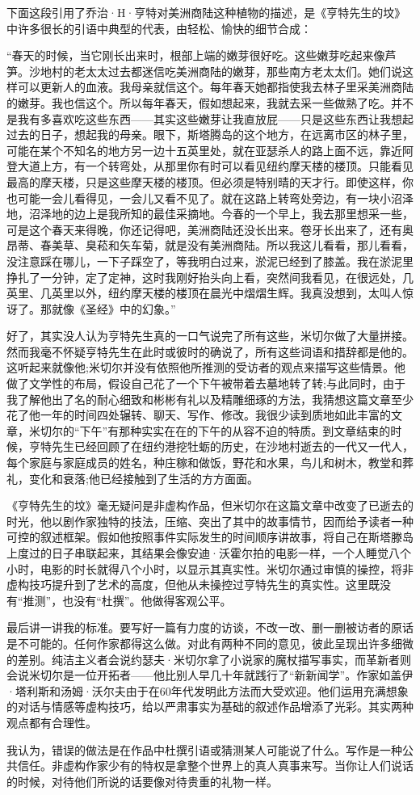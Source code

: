 下面这段引用了乔治·H·亨特对美洲商陆这种植物的描述，是《亨特先生的坟》中许多很长的引语中典型的代表，由轻松、愉快的细节合成：

“春天的时候，当它刚长出来时，根部上端的嫩芽很好吃。这些嫩芽吃起来像芦笋。沙地村的老太太过去都迷信吃美洲商陆的嫩芽，那些南方老太太们。她们说这样可以更新人的血液。我母亲就信这个。每年春天她都指使我去林子里采美洲商陆的嫩芽。我也信这个。所以每年春天，假如想起来，我就去采一些做熟了吃。并不是我有多喜欢吃这些东西——其实这些嫩芽让我直放屁——只是这些东西让我想起过去的日子，想起我的母亲。眼下，斯塔腾岛的这个地方，在远离市区的林子里，可能在某个不知名的地方另一边十五英里处，就在亚瑟杀人的路上面不远，靠近阿登大道上方，有一个转弯处，从那里你有时可以看见纽约摩天楼的楼顶。只能看见最高的摩天楼，只是这些摩天楼的楼顶。但必须是特别晴的天才行。即使这样，你也可能一会儿看得见，一会儿又看不见了。就在这路上转弯处旁边，有一块小沼泽地，沼泽地的边上是我所知的最佳采摘地。今春的一个早上，我去那里想采一些，可是这个春天来得晚，你还记得吧，美洲商陆还没长出来。卷牙长出来了，还有奥昂蒂、春美草、臭菘和矢车菊，就是没有美洲商陆。所以我这儿看看，那儿看看，没注意踩在哪儿，一下子踩空了，等我明白过来，淤泥已经到了膝盖。我在淤泥里挣扎了一分钟，定了定神，这时我刚好抬头向上看，突然间我看见，在很远处，几英里、几英里以外，纽约摩天楼的楼顶在晨光中熠熠生辉。我真没想到，太叫人惊讶了。那就像《圣经》中的幻象。”

好了，其实没人认为亨特先生真的一口气说完了所有这些，米切尔做了大量拼接。然而我毫不怀疑亨特先生在此时或彼时的确说了，所有这些词语和措辞都是他的。这听起来就像他;米切尔并没有依照他所推测的受访者的观点来描写这些情景。他做了文学性的布局，假设自己花了一个下午被带着去墓地转了转;与此同时，由于我了解他出了名的耐心细致和彬彬有礼以及精雕细琢的方法，我猜想这篇文章至少花了他一年的时间四处辗转、聊天、写作、修改。我很少读到质地如此丰富的文章，米切尔的“下午”有那种实实在在的下午的从容不迫的特质。到文章结束的时候，亨特先生已经回顾了在纽约港挖牡蛎的历史，在沙地村逝去的一代又一代人，每个家庭与家庭成员的姓名，种庄稼和做饭，野花和水果，鸟儿和树木，教堂和葬礼，变化和衰落;他已经接触到了生活的方方面面。

《亨特先生的坟》毫无疑问是非虚构作品，但米切尔在这篇文章中改变了已逝去的时光，他以剧作家独特的技法，压缩、突出了其中的故事情节，因而给予读者一种可控的叙述框架。假如他按照事件实际发生的时间顺序讲故事，将自己在斯塔滕岛上度过的日子串联起来，其结果会像安迪·沃霍尔拍的电影一样，一个人睡觉八个小时，电影的时长就得八个小时，以显示其真实性。米切尔通过审慎的操控，将非虚构技巧提升到了艺术的高度，但他从未操控过亨特先生的真实性。这里既没有“推测”，也没有“杜撰”。他做得客观公平。

最后讲一讲我的标准。要写好一篇有力度的访谈，不改一改、删一删被访者的原话是不可能的。任何作家都得这么做。对此有两种不同的意见，彼此呈现出许多细微的差别。纯洁主义者会说约瑟夫·米切尔拿了小说家的魔杖描写事实，而革新者则会说米切尔是一位开拓者——他比别人早几十年就践行了“新新闻学”。作家如盖伊·塔利斯和汤姆·沃尔夫由于在60年代发明此方法而大受欢迎。他们运用充满想象的对话与情感等虚构技巧，给以严肃事实为基础的叙述作品增添了光彩。其实两种观点都有合理性。

我认为，错误的做法是在作品中杜撰引语或猜测某人可能说了什么。写作是一种公共信任。非虚构作家少有的特权是拿整个世界上的真人真事来写。当你让人们说话的时候，对待他们所说的话要像对待贵重的礼物一样。